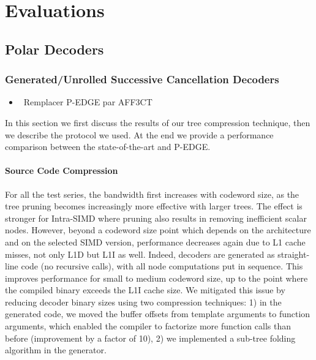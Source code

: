\graphicspath{{main/chapter5/fig/}}

\chapter{Evaluations}

\minitoccustom

\section{Polar Decoders}

\subsection{Generated/Unrolled Successive Cancellation Decoders}

\begin{itemize}
  \item \xmark~Remplacer P-EDGE par AFF3CT
\end{itemize}

In this section we first discuss the results of our tree compression technique,
then we describe the protocol we used. At the end we provide a performance
comparison between the state-of-the-art and P-EDGE.

\subsubsection{Source Code Compression}

For all the test series, the bandwidth first increases with codeword size, as
the tree pruning becomes increasingly more effective with larger trees. The
effect is stronger for Intra-SIMD where pruning also results in removing
inefficient scalar nodes. However, beyond a codeword size point which depends on
the architecture and on the selected SIMD version, performance decreases again
due to L1 cache misses, not only L1D but L1I as well. Indeed, decoders are
generated as straight-line code (no recursive calls), with all node computations
put in sequence. This improves performance for small to medium codeword size, up
to the point where the compiled binary exceeds the L1I cache size.
We mitigated this issue by reducing decoder binary sizes using two compression
techniques: 1) in the generated code, we moved the buffer offsets from template
arguments to function arguments, which enabled the compiler to factorize more
function calls than before (improvement by a factor of 10), 2) we implemented a
sub-tree folding algorithm in the generator.

